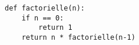 \begin{verbatim}
def factorielle(n):
    if n == 0:
        return 1
    return n * factorielle(n-1)
\end{verbatim}